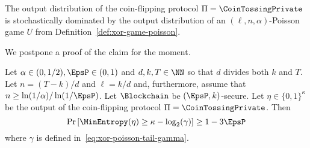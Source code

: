 
\begin{claim}\label{claim:correspondence-poissongame}
	The output distribution of the coin-flipping protocol $\Pi = \CoinTossingPrivate$ 
	is 
	stochastically dominated by the 
	output distribution of 
	an $(\ell, n, \alpha)$-Poisson game $U$ 
	from Definition~\ref{def:xor-game-poisson}.
\end{claim}
We postpone a proof of the claim for the moment.

\begin{proposition}\label{prop:coin-tossing-security-private}
	Let $\alpha \in (0, 1/2), \EpsP \in (0, 1)$ and $d, k, T \in \NN$ 
	so that $d$ divides both $k$ and $T$. 
	Let $n = (T - k)/d$ and $\ell = k/d$ 
	and, furthermore, assume that $n \geq \ln(1/\alpha)/\ln(1/\EpsP)$.
	Let $\Blockchain$ be $(\EpsP, k)$-secure. 
	Let $\eta \in \{0,1\}^\kappa$ be the output of 
	the coin-flipping protocol $\Pi = \CoinTossingPrivate$. 
	Then 
	\begin{equation}
		\Pr\left[\MinEntropy(\eta) \geq \kappa - \log_2(\gamma) \right] \geq 1 - 3 \EpsP
	\end{equation}
	where $\gamma$ is defined in~\eqref{eq:xor-poisson-tail-gamma}.


\end{proposition}


